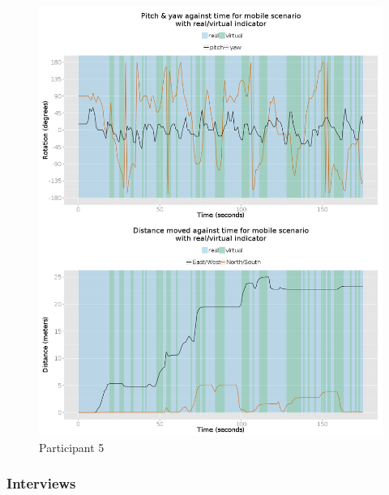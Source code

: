 \begin{figure}[h]
	\begin{center}
		\includegraphics[width=\linewidth]{images/29082014_1350_2up.png}
		\caption{Participant 5}
		\label{participant_5_2up}
	\end{center}
\end{figure}


\pagebreak

\subsubsection{Interviews}


